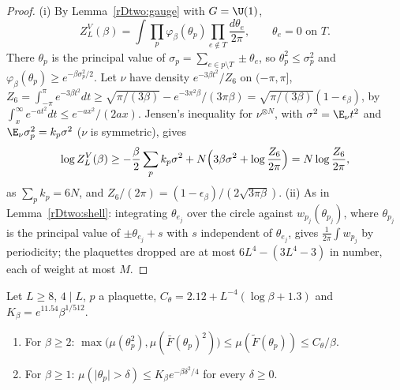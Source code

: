 \begin{proof}
(i) By Lemma~\ref{rDtwo:gauge} with $G=\U(1)$,
\[
Z^V_L(\beta)=\int\prod_p\varphi_\beta(\theta_p)\prod_{e\notin T}
\frac{d\theta_e}{2\pi},\qquad\theta_e=0\text{ on }T.
\]
There $\theta_p$ is the principal value of $\sigma_p=\sum_{e\in p
\setminus T}\pm\theta_e$, so $\theta_p^2\le\sigma_p^2$ and $\varphi_\beta(
\theta_p)\ge e^{-\beta\sigma_p^2/2}$. Let $\nu$ have density $e^{-3\beta t^2}
/Z_6$ on $(-\pi,\pi]$, $Z_6=\int_{-\pi}^\pi e^{-3\beta t^2}dt\ge\sqrt{\pi/(3
\beta)}-e^{-3\pi^2\beta}/(3\pi\beta)=\sqrt{\pi/(3\beta)}(1-\epsilon_\beta)$,
by $\int_x^\infty e^{-at^2}dt\le e^{-ax^2}/(2ax)$. Jensen's inequality for
$\nu^{\otimes N}$, with $\sigma^2=\E_\nu t^2$ and $\E_\nu\sigma_p^2=k_p\sigma^2$
($\nu$ is symmetric), gives
\[
\log Z^V_L(\beta)\ge-\frac\beta2\sum_pk_p\sigma^2+N\Bigl(3\beta\sigma^2+\log
\frac{Z_6}{2\pi}\Bigr)=N\log\frac{Z_6}{2\pi},
\]
as $\sum_pk_p=6N$, and $Z_6/(2\pi)=(1-\epsilon_\beta)/(2\sqrt{3\pi\beta})$.
(ii) As in Lemma~\ref{rDtwo:shell}: integrating $\theta_{e_j}$ over the
circle against $w_{p_j}(\theta_{p_j})$, where $\theta_{p_j}$ is the principal
value of $\pm\theta_{e_j}+s$ with $s$ independent of $\theta_{e_j}$, gives
$\frac1{2\pi}\int w_{p_j}$ by periodicity; the plaquettes dropped are at
most $6L^4-(3L^4-3)$ in number, each of weight at most $M$.
\end{proof}

\begin{proposition}\label{rDtwo:villainmoments}
Let $L\ge8$, $4\mid L$, $p$ a plaquette, $C_\theta=2.12+L^{-4}(\log\beta+1.3)$
and $K_\beta=e^{11.54}\beta^{1/512}$.
\begin{enumerate}[label=\textup{(\roman*)},leftmargin=*]
\item For $\beta\ge2$: $\max\bigl(\mu(\theta_p^2),\mu(\bar F(\theta_p)^2)\bigr)
\le\mu(\tilde F(\theta_p))\le C_\theta/\beta$.
\item For $\beta\ge1$: $\mu(\lvert\theta_p\rvert>\delta)\le K_\beta e^{-\beta
\delta^2/4}$ for every $\delta\ge0$.
\end{enumerate}
\end{proposition}

